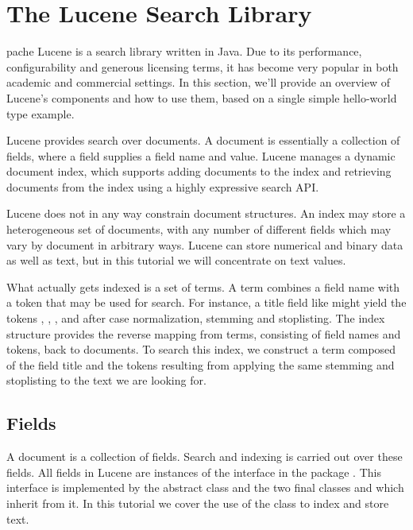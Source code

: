 \chapter{The Lucene Search Library}\label{chap:lucene}

pache Lucene is a search library written in Java.  Due to
its performance, configurability and generous licensing terms, it has
become very popular in both academic and commercial settings.  In this
section, we'll provide an overview of Lucene's components and how to
use them, based on a single simple hello-world type example.  

Lucene provides search over documents.  A document is essentially a
collection of fields, where a field supplies a field name and value.
Lucene manages a dynamic document index, which supports adding
documents to the index and retrieving documents from the index using a
highly expressive search API.  

Lucene does not in any way constrain document structures.  An index
may store a heterogeneous set of documents, with any number of
different fields which may vary by document in arbitrary ways. 
Lucene can store numerical and binary data as well as text, 
but in this tutorial we will concentrate on text values.

What actually gets indexed is a set of terms.  A term combines a field
name with a token that may be used for search.  For instance, a title
field like  might yield
the tokens , ,
, and  after case
normalization, stemming and stoplisting.  The index structure provides
the reverse mapping from terms, consisting of field names and tokens,
back to documents.  To search this index, we construct a term composed
of the field title and the tokens resulting from applying the same
stemming and stoplisting to the text we are looking for.

\section{Fields}

A document is a collection of fields.
Search and indexing is carried out over these fields.
All fields in Lucene are instances of the  interface
in the package .  This interface is 
implemented by the abstract class  and the
two final classes  and  which inherit
from it.  In this tutorial we cover the use of the class 
to index and store text.

